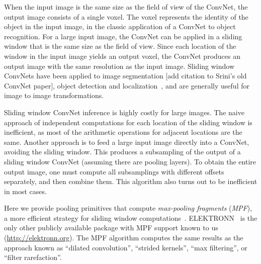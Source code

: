 \documentclass[conference]{./IEEEtran/IEEEtran}
\begin{document}
  When the input image is the same size as the field of view of the
  ConvNet, the output image consists of a single voxel.  The voxel
  represents the identity of the object in the input image, in the
  classic application of a ConvNet to object recognition. For a large
  input image, the ConvNet can be applied in a sliding window that is
  the same size as the field of view.  Since each location of the
  window in the input image yields an output voxel, the ConvNet
  produces an output image with the same resolution as the input
  image.  Sliding window ConvNets have been applied to image
  segmentation [add citation to Srini's old ConvNet
  paper]\cite{ciresan2012deep}, object detection and
  localization~\cite{sermanet2013overfeat}, and are generally useful
  for image to image transformations.

  Sliding window ConvNet inference is highly costly for large images.
  The naive approach of independent computations for each location of
  the sliding window is inefficient, as most of the arithmetic
  operations for adjacent locations are the same.  Another approach is
  to feed a large input image directly into a ConvNet, avoiding the
  sliding window. This produces a subsampling of the output of a
  sliding window ConvNet (assuming there are pooling layers).  To
  obtain the entire output image, one must compute all subsamplings
  with different offsets separately, and then combine them.  This
  algorithm also turns out to be inefficient in most cases.

  Here we provide pooling primitives that compute \emph{max-pooling
  fragments} (\emph{MPF}), a more efficient strategy for sliding
  window computations~\cite{giusti2013fast, masci2013fast}.
  ELEKTRONN~\cite{ELEKTRONN2015} is the only other publicly available
  package with MPF support known to us (\url{http://elektronn.org}).
  The MPF algorithm computes the same results as the approach known as
  ``dilated convolution''\cite{yu2015multi}, ``strided
  kernels''\cite{tschopp2015efficient}, ``max
  filtering''\cite{zlateski2015znn}, or ``filter
  rarefaction''\cite{long2015fully}.
\end{document}
